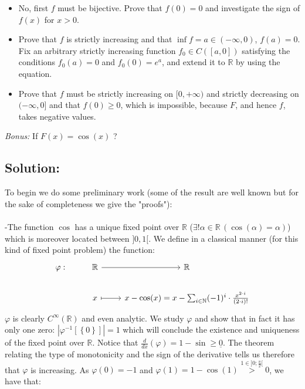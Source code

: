 \begin{solution}
    \begin{itemize}
        \item[(a)] No, first \( f \) must be bijective. Prove that \( f\left(0\right) = 0 \) and investigate the sign of \( f\left(x\right) \) for \( x > 0 \).
        \item[(b)] Prove that \( f \) is strictly increasing and that \( \inf f = a \in \left(-\infty, 0\right) \), \( f\left(a\right) = 0 \). Fix an arbitrary strictly increasing function \( f_0 \in C\left(\left[a,0\right]\right) \) satisfying the conditions \( f_0\left(a\right) = 0 \) and \( f_0\left(0\right) = e^a \), and extend it to \( \mathbb{R} \) by using the equation.
        \item[(c)] Prove that \( f \) must be strictly increasing on \( [0, +\infty) \) and strictly decreasing on \( (-\infty, 0] \) and that \( f\left(0\right) \geq 0 \), which is impossible, because \( F \), and hence \( f \), takes negative values.
    \end{itemize}
    \textit{Bonus:} If \( F\left(x\right)=\cos\left(x\right) \) ? \subsection*{Solution:} To begin we do some preliminary work (some of the result are well known but for the sake of completeness we give the "proofs"):
    \\\\
    -The function \( \cos \) has a unique fixed point over \( \mathbb{R} \) (\( \exists!\alpha\in\mathbb{R}\,\left(\cos\left(\alpha\right)=\alpha\right) \)) which is moreover located between \( ]0,1[ \). We define in a classical manner (for this kind of fixed point problem) the function:
    \[\begin{tikzcd}
            {\varphi:} & {\mathbb{R}} & {\mathbb{R}} \\
            & x & {x-\cos(x)=x-\sum_{i\in\mathbb{N}}(-1)^{i}\cdot\frac{x^{2\cdot i}}{(2\cdot i)!}}
            \arrow[from=1-2, to=1-3]
            \arrow[maps to, from=2-2, to=2-3]
        \end{tikzcd}\]
    \( \varphi \) is clearly \( C^{\infty}\left(\mathbb{R}\right) \) and even analytic. We study \( \varphi \) and show that in fact it has only one zero: \( |\varphi^{-1}\left[\left\{0\right\}\right]|=1 \) which will conclude the existence and uniqueness of the fixed point over \( \mathbb{R} \). Notice that \( \frac{d}{dx}\left(\varphi\right)=1-\sin\geq \underline{0} \). The theorem relating the type of monotonicity and the sign of the derivative tells us therefore that \( \varphi \) is increasing. As \( \varphi\left(0\right)=-1 \) and \( \varphi\left(1\right)=1-\cos\left(1\right)\overset{1\in]0;\frac{\pi}{2}[}{>}0 \), we have that:

\end{solution}
